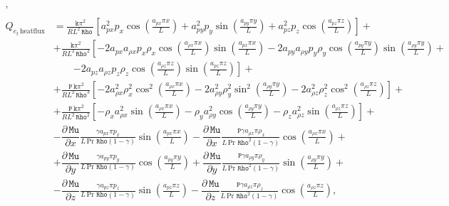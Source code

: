 \documentclass[10pt]{article}
\newcommand{\diff}[2] {\dfrac{\partial #1}{\partial #2}}
\newcommand{\Rho}{\,\mathtt{Rho}}
\newcommand{\PP}{\,\mathtt{P}}
\newcommand{\Mu}{\,\mathtt{Mu}}
\newcommand{\DMuDx}{\diff{\Mu}{x}}
\newcommand{\DMuDy}{\diff{\Mu}{y}}
\newcommand{\DMuDz}{\diff{\Mu}{z}}
\begin{document}
\begin{equation*}
\begin{split}
,\\
%
&\\
%
 Q_{e_t \, \text{heatflux}}&= 
\frac{\texttt{k} \pi^{2} }{R L^{2} \Rho \, }\left[a_{px}^{2} p_{x} \cos\left(\frac{a_{px} \pi x}{L}\right) + a_{py}^{2} p_{y} \sin\left(\frac{a_{py} \pi y}{L}\right) + a_{pz}^{2} p_{z} \cos\left(\frac{a_{pz} \pi z}{L}\right)\right] +\\
&+ \frac{\texttt{k} \pi^{2} }{R L^{2} \Rho^{2}}\left[- 2 a_{px} a_{\rho x} p_{x} \rho_{x} \cos\left(\frac{a_{\rho x} \pi x}{L}\right) \sin\left(\frac{a_{px} \pi x}{L}\right) - 2 a_{py} a_{\rho y} p_{y} \rho_{y} \cos\left(\frac{a_{py} \pi y}{L}\right) \sin\left(\frac{a_{\rho y} \pi y}{L}\right) +\right.\\
 &\qquad\left.- 2 a_{pz} a_{\rho z} p_{z} \rho_{z} \cos\left(\frac{a_{\rho z} \pi z}{L}\right) \sin\left(\frac{a_{pz} \pi z}{L}\right)\right] +\\
&+ \frac{\PP \, \texttt{k} \pi^{2} }{R L^{2} \Rho^{3}}\left[- 2 a_{\rho x}^{2} \rho_{x}^{2} \cos^{2}\left(\frac{a_{\rho x} \pi x}{L}\right) - 2 a_{\rho y}^{2} \rho_{y}^{2} \sin^{2}\left(\frac{a_{\rho y} \pi y}{L}\right) - 2 a_{\rho z}^{2} \rho_{z}^{2} \cos^{2}\left(\frac{a_{\rho z} \pi z}{L}\right)\right] +\\
&+ \frac{\PP \, \texttt{k} \pi^{2} }{R L^{2} \Rho^{2}}\left[- \rho_{x} a_{\rho x}^{2} \sin\left(\frac{a_{\rho x} \pi x}{L}\right) - \rho_{y} a_{\rho y}^{2} \cos\left(\frac{a_{\rho y} \pi y}{L}\right) - \rho_{z} a_{\rho z}^{2} \sin\left(\frac{a_{\rho z} \pi z}{L}\right)\right]+\\
%
&- \DMuDx \frac{\gamma a_{px} \pi p_{x} }{L\, \text{Pr} \, \Rho \left(1 - \gamma\right)} \sin\left(\frac{ a_{px} \pi x}{L}\right)
- \DMuDx \frac{\PP \gamma  a_{\rho x} \pi \rho_{x} }{L\, \text{Pr} \, \Rho^{2} \left(1 - \gamma\right)} \cos\left(\frac{ a_{\rho x} \pi x}{L}\right)+\\
&+\DMuDy \frac{\gamma a_{py} \pi p_{y} }{L\, \text{Pr} \, \Rho \left(1 - \gamma\right)} \cos\left(\frac{ a_{py} \pi y}{L}\right)
+ \DMuDy \frac{\PP \gamma  a_{\rho y} \pi \rho_{y} }{L\, \text{Pr} \, \Rho^{2} \left(1 - \gamma\right)} \sin\left(\frac{ a_{\rho y} \pi y}{L}\right)+\\
&- \DMuDz \frac{\gamma a_{pz} \pi p_{z} }{L\, \text{Pr} \, \Rho \left(1 - \gamma\right)}\sin\left(\frac{ a_{pz} \pi z}{L}\right) - \DMuDz \frac{\PP \gamma  a_{\rho z} \pi \rho_{z} }{L\, \text{Pr} \, \Rho^{2} \left(1 - \gamma\right)}\cos\left(\frac{ a_{\rho z} \pi z}{L}\right),\\
%
&\\

\end{split}
\end{equation*}
\end{document}

